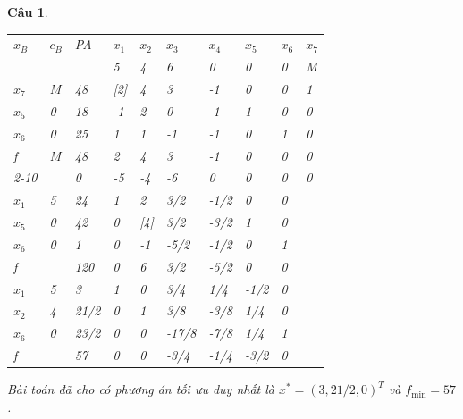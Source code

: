 \documentclass[12pt,a4letter]{article}
\newtheorem{btbt}{Câu}%
\newenvironment{cauhoi}{\begin{btbt}\rm }{\end{btbt}}
\begin{document}
\begin{cauhoi}
\begin{traloi}
\begin{tabular}{| l | l | l | l  l  l  l  l  l  l |}
\hline
$x_B$&$c_B$&PA&$x_1$&$x_2$&$x_3$&$x_4$&$x_5$&$x_6$&$x_7$\\ 
&&&5&4&6&0&0&0&M\\ 
\hline
$x_7$&M&48&[2]&4&3&-1&0&0&1\\ 
$x_5$&0&18&-1&2&0&-1&1&0&0\\ 
$x_6$&0&25&1&1&-1&-1&0&1&0\\
\hline 
f &M&48&2&4&3&-1&0&0&0\\ 
\cline{2-10}
&&0&-5&-4&-6&0&0&0&0\\ 
\hline
$x_1$&5&24&1&2&3/2&-1/2&0&0&\\ 
$x_5$&0&42&0&[4]&3/2&-3/2&1&0&\\ 
$x_6$&0&1&0&-1&-5/2&-1/2&0&1&\\ 
\hline
f&&120&0&6&3/2&-5/2&0&0&\\ 
\hline
$x_1$&5&3&1&0&3/4&1/4&-1/2&0&\\ 
$x_2$&4&21/2&0&1&3/8&-3/8&1/4&0&\\ 
$x_6$&0&23/2&0&0&-17/8&-7/8&1/4&1&\\ 
\hline
f&&57&0&0&-3/4&-1/4&-3/2&0&\\ 
\hline
\end{tabular}

Bài toán đã cho có phương án tối ưu duy nhất là
$x^*=(3, 21/2, 0)^T$ và $f_{\min}=57$.
\end{traloi}
\end{cauhoi}

% 
% 
% 
% 
% 
% 
% 
% 
% 
\newpage
{}
\end{document}
